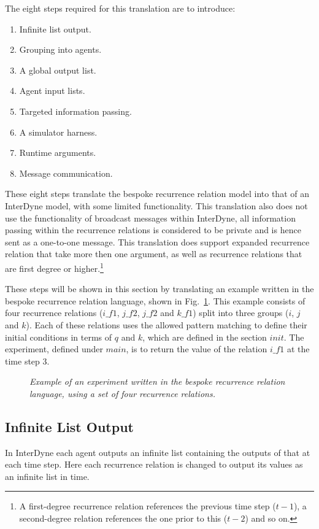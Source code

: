 \documentclass{article}
\begin{document}
The eight steps required for this translation are to introduce:
\begin{enumerate}
  \item Infinite list output.
  \item Grouping into agents.
  \item A global output list.
  \item Agent input lists.
  \item Targeted information passing.
  \item A simulator harness.
  \item Runtime arguments.
  \item Message communication.
\end{enumerate} 
These eight steps translate the bespoke recurrence relation model into that of an InterDyne model, with some limited functionality. This translation also does not use the functionality of broadcast messages within InterDyne, all information passing within the recurrence relations is considered to be private and is hence sent as a one-to-one message. This translation does support expanded recurrence relation that take more then one argument, as well as recurrence relations that are first degree or higher.\footnote{A first-degree recurrence relation references the previous time step ($t-1$), a second-degree relation references the one prior to this ($t-2$) and so on.}  

These steps will be shown in this section by translating an example written in the bespoke recurrence relation language, shown in Fig.~\ref{fig:rre1}. This example consists of four recurrence relations ($i\_f1$, $j\_f2$, $j\_f2$ and $k\_f1$) split into three groups ($i$, $j$ and $k$). Each of these relations uses the allowed pattern matching to define their initial conditions in terms of $q$ and $k$, which are defined in the section $init$. The experiment, defined under $main$, is to return the value of the relation $i\_f1$ at the time step 3.  
\begin{figure}[H]
	\centering
	
	\caption{\it Example of an experiment written in the bespoke recurrence relation language, using a set of four recurrence relations.}
	\label{fig:rre1}
\end{figure} 





\subsection{Infinite List Output}
In InterDyne each agent outputs an infinite list containing the outputs of that at each time step. Here each recurrence relation is changed to output its values as an infinite list in time.
\end{document}
